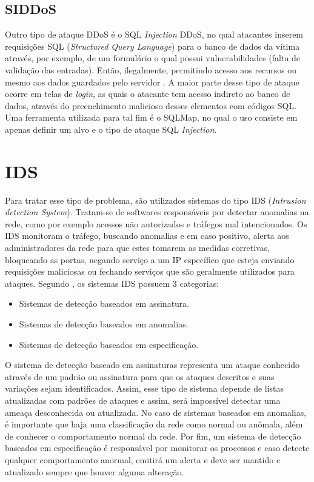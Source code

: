  
 \subsection{SIDDoS}   
  Outro tipo de ataque DDoS é o SQL \textit{Injection} DDoS, no qual atacantes inserem  requisições SQL (\textit{Structured Query Language}) para o banco de dados da vítima através, por exemplo, de um formulário o qual possui vulnerabilidades (falta de validação das entradas). Então, ilegalmente, permitindo acesso aos recursos ou mesmo aos dados guardados pelo servidor \cite{DataMining}. A maior parte desse tipo de ataque ocorre em telas de \textit{login}, as quais o atacante tem acesso indireto ao banco de dados, através do preenchimento malicioso desses elementos com códigos SQL. Uma ferramenta utilizada para tal fim é o SQLMap, no qual o uso consiste em apenas definir um alvo e o tipo de ataque SQL \textit{Injection}. 

\section{IDS}

Para tratar esse tipo de problema, são utilizados sistemas do tipo IDS (\textit{Intrusion detection System}). Tratam-se de softwares responsáveis  por detectar anomalias na rede, como por exemplo acessos não autorizados e tráfegos mal intencionados. Os IDS monitoram o tráfego, buscando anomalias e em caso positivo, alerta aos administradores da rede para que estes tomarem as medidas corretivas, bloqueando as portas, negando serviço a um IP específico que esteja enviando requisições maliciosas ou fechando serviços que são geralmente utilizados para ataques. Segundo , os sistemas IDS possuem 3 categorias: 
\begin{itemize}
	\item Sistemas de detecção baseados em assinatura.
	\item Sistemas de detecção baseados em anomalias.
	\item Sistemas de detecção baseados em especificação.
\end{itemize}

O sistema de detecção baseado em assinaturas representa um ataque conhecido através de um padrão ou assinatura para que os ataques descritos e suas variações sejam identificados. Assim, esse tipo de sistema depende de listas atualizadas com padrões de ataques e assim, será impossível detectar uma ameaça desconhecida ou atualizada. No caso de sistemas baseados em anomalias, é importante que haja uma classificação da rede como normal ou anômala, além de conhecer o comportamento normal da rede. Por fim, um sistema de detecção baseados em especificação é responsável por monitorar os processos e caso detecte qualquer comportamento anormal, emitirá um alerta e deve ser mantido e atualizado sempre que houver alguma alteração.

